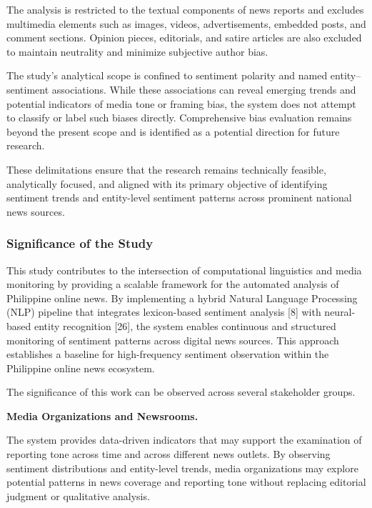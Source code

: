 The analysis is restricted to the textual components of news reports and excludes multimedia elements such as images, videos, advertisements, embedded posts, and comment sections. Opinion pieces, editorials, and satire articles are also excluded to maintain neutrality and minimize subjective author bias.

The study's analytical scope is confined to sentiment polarity and named entity-- sentiment associations. While these associations can reveal emerging trends and potential indicators of media tone or framing bias, the system does not attempt to classify or label such biases directly. Comprehensive bias evaluation remains beyond the present scope and is identified as a potential direction for future research.

These delimitations ensure that the research remains technically feasible, analytically focused, and aligned with its primary objective of identifying sentiment trends and entity-level sentiment patterns across prominent national news sources.

\subsubsection{\texorpdfstring{\textbf{Significance of the Study}}{Significance of the Study}}\label{significance-of-the-study}

This study contributes to the intersection of computational linguistics and media monitoring by providing a scalable framework for the automated analysis of Philippine online news. By implementing a hybrid Natural Language Processing (NLP) pipeline that integrates lexicon-based sentiment analysis {[}8{]} with neural-based entity recognition {[}26{]}, the system enables continuous and structured monitoring of sentiment patterns across digital news sources. This approach establishes a baseline for high-frequency sentiment observation within the Philippine online news ecosystem.

The significance of this work can be observed across several stakeholder groups.

\textbf{Media Organizations and Newsrooms.}

The system provides data-driven indicators that may support the examination of reporting tone across time and across different news outlets. By observing sentiment distributions and entity-level trends, media organizations may explore potential patterns in news coverage and reporting tone without replacing editorial judgment or qualitative analysis.

